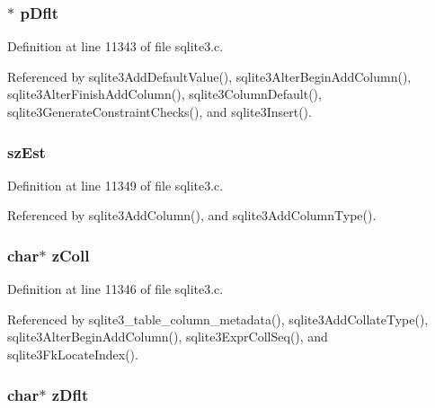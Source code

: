\subsubsection[{p\+Dflt}]{$\ast$ p\+Dflt}\label{struct_column_ae517aa21ac9c2666eb015bb57c8f9362}


Definition at line 11343 of file sqlite3.\+c.



Referenced by sqlite3\+Add\+Default\+Value(), sqlite3\+Alter\+Begin\+Add\+Column(), sqlite3\+Alter\+Finish\+Add\+Column(), sqlite3\+Column\+Default(), sqlite3\+Generate\+Constraint\+Checks(), and sqlite3\+Insert().

\hypertarget{struct_column_a6a9078b6732e33d101983427e2eea7a9}{}
\subsubsection[{sz\+Est}]{ sz\+Est}\label{struct_column_a6a9078b6732e33d101983427e2eea7a9}


Definition at line 11349 of file sqlite3.\+c.



Referenced by sqlite3\+Add\+Column(), and sqlite3\+Add\+Column\+Type().

\hypertarget{struct_column_a262c87d8fe493531ec15e58fb8b66f8c}{}
\subsubsection[{z\+Coll}]{\setlength{\rightskip}{0pt plus 5cm}char$\ast$ z\+Coll}\label{struct_column_a262c87d8fe493531ec15e58fb8b66f8c}


Definition at line 11346 of file sqlite3.\+c.



Referenced by sqlite3\+\_\+table\+\_\+column\+\_\+metadata(), sqlite3\+Add\+Collate\+Type(), sqlite3\+Alter\+Begin\+Add\+Column(), sqlite3\+Expr\+Coll\+Seq(), and sqlite3\+Fk\+Locate\+Index().

\hypertarget{struct_column_a71f007e8ffe748cdf38ca3aa9ee16c5f}{}
\subsubsection[{z\+Dflt}]{\setlength{\rightskip}{0pt plus 5cm}char$\ast$ z\+Dflt}\label{struct_column_a71f007e8ffe748cdf38ca3aa9ee16c5f}


